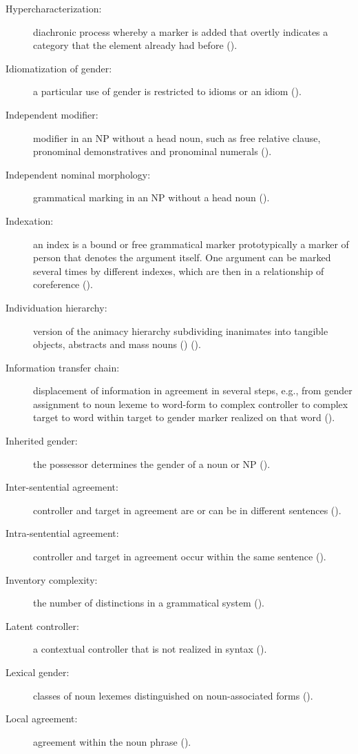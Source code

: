 \documentclass[output=collectionpaper]{langsci/langscibook}
\begin{document}
{\begin{description}
\item  [Hypercharacterization:] diachronic process whereby a marker is added that overtly indicates a category that the element already had before ().
\item  [Idiomatization of gender:] a particular use of gender is restricted to idioms or an idiom ().
\item  [Independent modifier:] modifier in an NP without a head noun, such as free relative clause, pronominal demonstratives and pronominal numerals ().
\item  [Independent nominal morphology:] grammatical marking in an NP without a head noun ().
\item  [Indexation:] an index is a bound or free grammatical marker \textendash{} prototypically a marker of person \textendash{} that denotes the argument itself. One argument can be marked several times by different indexes, which are then in a relationship of coreference ().
\item  [Individuation hierarchy:] version of the animacy hierarchy subdividing inanimates into tangible objects, abstracts and mass nouns (\citealt{Sasse1993}) ().
\item  [Information transfer chain:] displacement of information in agreement in several steps, e.g., from gender assignment to noun lexeme to word-form to complex controller to complex target to word within target to gender marker realized on that word ().
\item  [Inherited gender:] the possessor determines the gender of a noun or NP ().
\item  [Inter-sentential agreement:] controller and target in agreement are or can be in different sentences ().
\item  [Intra-sentential agreement:] controller and target in agreement occur within the same sentence ().
\item  [Inventory complexity:] the number of distinctions in a grammatical system ().
\item  [Latent controller:] a contextual controller that is not realized in syntax ().
\item  [Lexical gender:] classes of noun lexemes distinguished on noun-associated forms ().
\item  [Local agreement:] agreement within the noun phrase ().

\end{description}}
\end{document}
